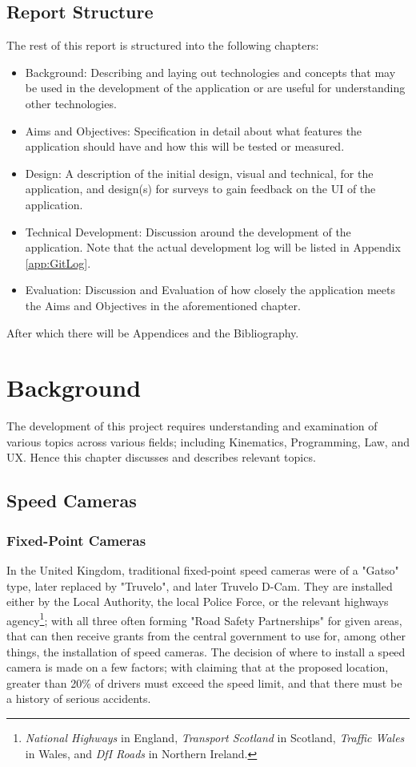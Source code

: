 \documentclass[11pt, a4paper, notitlepage]{report}
\begin{document}
\section{Report Structure}
The rest of this report is structured into the following chapters:
\begin{itemize}
	\item Background: Describing and laying out technologies and concepts that may be used in the development of the application or are useful for understanding other technologies.
	\item Aims and Objectives: Specification in detail about what features the application should have and how this will be tested or measured.
	\item Design: A description of the initial design, visual and technical, for the application, and design(s) for surveys to gain feedback on the UI of the application.
	\item Technical Development: Discussion around the development of the application. Note that the actual development log will be listed in Appendix \ref{app:GitLog}.
    \item Evaluation: Discussion and Evaluation of how closely the application meets the Aims and Objectives in the aforementioned chapter.
\end{itemize}
After which there will be Appendices and the Bibliography. %
\chapter{Background}
The development of this project requires understanding and examination of various topics across various fields; including Kinematics, Programming, Law, and UX. Hence this chapter discusses and describes relevant topics.
\section{Speed Cameras}
\subsection{Fixed-Point Cameras}
In the United Kingdom, traditional fixed-point speed cameras were of a "Gatso" type, later replaced by "Truvelo", and later Truvelo D-Cam. They are installed either by the Local Authority, the local Police Force, or the relevant highways agency\footnote{\textit{National Highways} in England, \textit{Transport Scotland} in Scotland, \textit{Traffic Wales} in Wales, and \textit{DfI Roads} in Northern Ireland.}; with all three often forming "Road Safety Partnerships" for given areas, that can then receive grants from the central government \citep{RSPGrantDetails} to use for, among other things, the installation of speed cameras. The decision of where to install a speed camera is made on a few factors; with \citet{SpeedCameraInstalltion} claiming that at the proposed location, greater than 20\% of drivers must exceed the speed limit, and that there must be a history of serious accidents.
\end{document}
